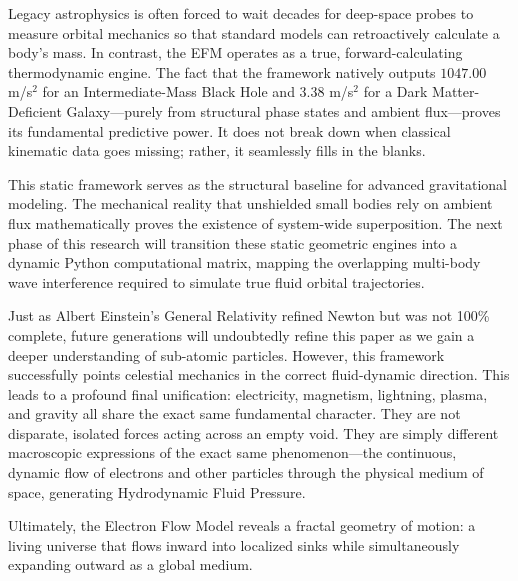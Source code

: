 \documentclass[11pt, a4paper]{article}
\begin{document}
  Legacy astrophysics is often forced to wait decades for deep-space probes to measure orbital mechanics so that standard models can retroactively calculate a body's mass. In contrast, the EFM operates as a true, forward-calculating thermodynamic engine. The fact that the framework natively outputs $1047.00$ m/s$^2$ for an Intermediate-Mass Black Hole and $3.38$ m/s$^2$ for a Dark Matter-Deficient Galaxy---purely from structural phase states and ambient flux---proves its fundamental predictive power. It does not break down when classical kinematic data goes missing; rather, it seamlessly fills in the blanks.

  This static framework serves as the structural baseline for advanced gravitational modeling. The mechanical reality that unshielded small bodies rely on ambient flux mathematically proves the existence of system-wide superposition. The next phase of this research will transition these static geometric engines into a dynamic Python computational matrix, mapping the overlapping multi-body wave interference required to simulate true fluid orbital trajectories.

  Just as Albert Einstein's General Relativity refined Newton but was not 100\% complete, future generations will undoubtedly refine this paper as we gain a deeper understanding of sub-atomic particles. However, this framework successfully points celestial mechanics in the correct fluid-dynamic direction. This leads to a profound final unification: electricity, magnetism, lightning, plasma, and gravity all share the exact same fundamental character. They are not disparate, isolated forces acting across an empty void. They are simply different macroscopic expressions of the exact same phenomenon---the continuous, dynamic flow of electrons and other particles through the physical medium of space, generating Hydrodynamic Fluid Pressure.

  Ultimately, the Electron Flow Model reveals a fractal geometry of motion: a living universe that flows inward into localized sinks while simultaneously expanding outward as a global medium.
  
\clearpage
\appendix
\end{document}
